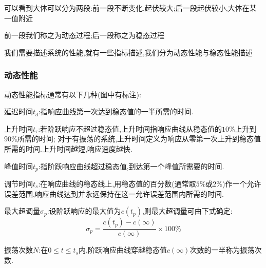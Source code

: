 \documentclass[12pt,a4paper,oneside]{ctexart}
\begin{document}
可以看到大体可以分为两段:前一段不断变化,起伏较大;后一段起伏较小,大体在某一值附近

前一段我们称之为动态过程;后一段称之为稳态过程

我们需要描述系统的性能,就有一些指标描述,我们分为动态性能与稳态性能描述

\subsubsection{动态性能}
动态性能指标通常有以下几种(图中有标注):

延迟时间$t_d$:指响应曲线第一次达到稳态值的一半所需的时间.

上升时间$t_{\tau}$:若阶跃响应不超过稳态值,上升时间指响应曲线从稳态值的$10\%$上升到$90\%$所需的时间;
对于有振荡的系统,上升时间定义为响应从零第一次上升到稳态值所需的时间.上升时间越短,响应速度越快.

峰值时间$t_p$:指阶跃响应曲线超过稳态值,到达第一个峰值所需要的时间.

调节时间$t_s$:在响应曲线的稳态线上,用稳态值的百分数(通常取$5\%$或$2\%$)作一个允许误差范围,响应曲线达到并永远保持在这一允许误差范围内所需的时间.

最大超调量$\sigma_p$:设阶跃响应的最大值为$c(t_p)$,则最大超调量可由下式确定:
\[
    \sigma_p = \frac{c(t_p)-c(\infty)}{c(\infty)} \times 100 \%
\]

振荡次数$N$:在$0\leqslant t\leqslant t_s$内,阶跃响应曲线穿越稳态值$c(\infty)$次数的一半称为振荡次数.
\end{document}
